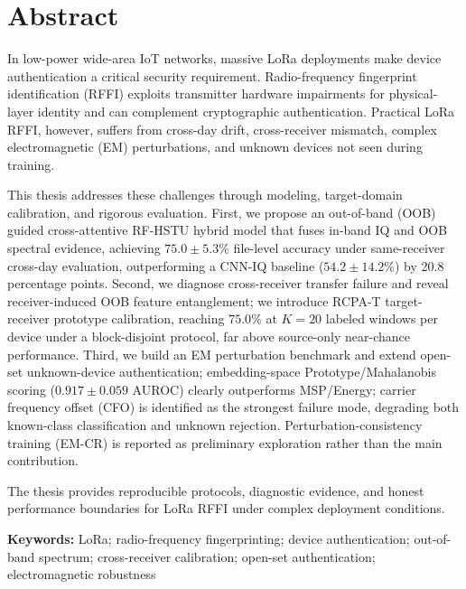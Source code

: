 \chapter*{Abstract}

\sloppy
In low-power wide-area IoT networks, massive LoRa deployments make device authentication a critical security requirement. Radio-frequency fingerprint identification (RFFI) exploits transmitter hardware impairments for physical-layer identity and can complement cryptographic authentication. Practical LoRa RFFI, however, suffers from cross-day drift, cross-receiver mismatch, complex electromagnetic (EM) perturbations, and unknown devices not seen during training.

This thesis addresses these challenges through modeling, target-domain calibration, and rigorous evaluation. First, we propose an out-of-band (OOB) guided cross-attentive RF-HSTU hybrid model that fuses in-band IQ and OOB spectral evidence, achieving $75.0\pm5.3\%$ file-level accuracy under same-receiver cross-day evaluation, outperforming a CNN-IQ baseline ($54.2\pm14.2\%$) by 20.8 percentage points. Second, we diagnose cross-receiver transfer failure and reveal receiver-induced OOB feature entanglement; we introduce RCPA-T target-receiver prototype calibration, reaching $75.0\%$ at $K{=}20$ labeled windows per device under a block-disjoint protocol, far above source-only near-chance performance. Third, we build an EM perturbation benchmark and extend open-set unknown-device authentication; embedding-space Prototype/Mahalanobis scoring ($0.917\pm0.059$ AUROC) clearly outperforms MSP/Energy; carrier frequency offset (CFO) is identified as the strongest failure mode, degrading both known-class classification and unknown rejection. Perturbation-consistency training (EM-CR) is reported as preliminary exploration rather than the main contribution.

The thesis provides reproducible protocols, diagnostic evidence, and honest performance boundaries for LoRa RFFI under complex deployment conditions.

\vspace{1em}
\noindent\textbf{Keywords:} LoRa; radio-frequency fingerprinting; device authentication; out-of-band spectrum; cross-receiver calibration; open-set authentication; electromagnetic robustness
